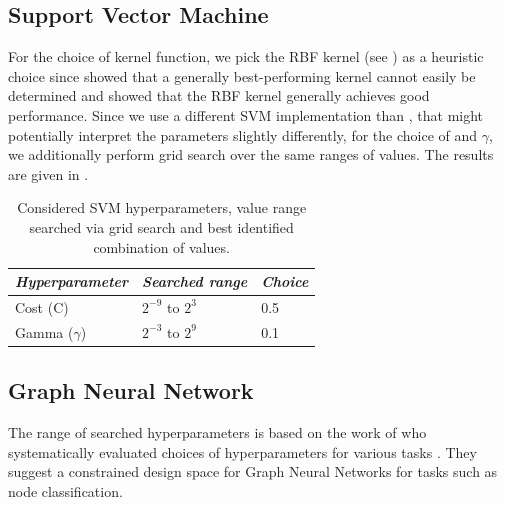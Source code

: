 \documentclass[
	fontsize=10pt, %
	twoside=false, %
	secnumdepth=1, %
  toc=indentunnumbered %
]{kaobook}
\begin{document}
\subsection{Support Vector Machine}

For the choice of kernel function, we pick the RBF kernel (see
) as a heuristic choice since
\citeauthor{nielsen_MachineLearningSupport_2019} showed that a generally
best-performing kernel cannot easily be determined and showed that the RBF
kernel generally achieves good performance.
%
Since we use a different SVM implementation than \nielsen, that might
potentially interpret the parameters slightly differently, for the choice of
 and $\gamma$, we additionally perform grid search over the same ranges
of values.
%
The results are given in
.

\begin{table}[h]
  \begin{tabular}[h]{| l | l | l |}
    \textit{Hyperparameter} & \textit{Searched range} & \textit{Choice} \\
    \hline
    Cost (C) & $2^{-9}$ to $2^3$ & 0.5 \\
    Gamma ($\gamma$) & $2^{-3}$ to $2^{9}$ & 0.1
  \end{tabular}
  \caption{Considered SVM hyperparameters, value range searched via grid search and
    best identified combination of values.}
  \label{tab:svm-hyperparams}
\end{table}



\subsection{Graph Neural Network}

The range of searched hyperparameters is based on the work of
\citeauthor{you_design_2020} who systematically evaluated choices of hyperparameters for
various tasks \cite{you_design_2020}. They suggest a constrained design space
for Graph Neural Networks for tasks such as node classification.  
\end{document}
